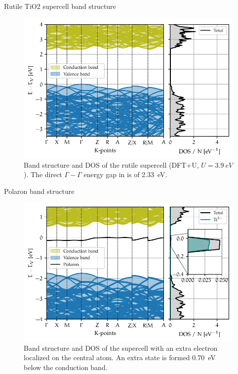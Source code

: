 \documentclass[11pt, xcolor=dvipsnames, aspectratio=43]{beamer}
\begin{document}
\begin{frame}{Rutile TiO2 supercell band structure}
    \begin{figure}
        \centering
        \includegraphics[height=0.7\textheight]{figures/super.pdf}
        \caption{Band structure and DOS of the rutile supercell (DFT+U, $U=\SI{3.9}{eV}$). The direct $\Gamma - \Gamma$ energy gap in is of \SI{2.33}{eV}.}
        \label{fig:bands_unit}
    \end{figure}
\end{frame}


\begin{frame}{Polaron band structure}
    \begin{figure}
        \centering
        \includegraphics[height=0.7\textheight]{figures/polaron.pdf}
        \caption{Band structure and DOS of the supercell with an extra electron localized on the central atom. An extra state is formed \SI{0.70}{eV} below the conduction band.}
    \end{figure}
\end{frame}
\end{document}
